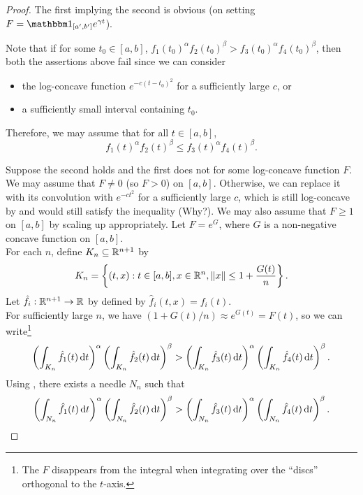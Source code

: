 \begin{proof}
	The first implying the second is obvious (on setting $F=\indic_{[a',b']}e^{\gamma t}$).

	Note that if for some $t_0\in[a,b]$, $f_1(t_0)^\alpha f_2(t_0)^\beta > f_3(t_0)^\alpha f_4(t_0)^\beta$, then both the assertions above fail since we can consider
	\begin{itemize}
		\item the log-concave function $e^{-c(t-t_0)^2}$ for a sufficiently large $c$, or
		\item a sufficiently small interval containing $t_0$.
	\end{itemize}
	Therefore, we may assume that for all $t\in[a,b]$,
	\begin{equation*}
		\label{eqn: init observation exp needle conv body}
		\tag{$*$}
		f_1(t)^\alpha f_2(t)^\beta \leq f_3(t)^\alpha f_4(t)^\beta.
	\end{equation*}

	Suppose the second holds and the first does not for some log-concave function $F$.\\
	We may assume that $F\neq 0$ (so $F>0$) on $[a,b]$. Otherwise, we can replace it with its convolution with $e^{-ct^2}$ for a sufficiently large $c$, which is still log-concave by  and would still satisfy the inequality (Why?). We may also assume that $F\geq 1$ on $[a,b]$ by scaling up appropriately. Let $F=e^G$, where $G$ is a non-negative concave function on $[a,b]$.\\
	For each $n$, define $K_n\subseteq\mathbb{R}^{n+1}$ by
	\[ K_n = \left\{ (t,x) : t\in[a,b], x\in\mathbb{R}^n, \left\lVert x\right\rVert \leq 1 + \frac{G(t)}{n} \right\}. \]
	Let $\hat{f}_i:\mathbb{R}^{n+1}\to\mathbb{R}$ by defined by $\hat{f}_i(t,x)=f_i(t)$.\\
	For sufficiently large $n$, we have $(1+G(t)/n)\approx e^{G(t)} = F(t)$, so we can write\footnote{The $F$ disappears from the integral when integrating over the ``discs'' orthogonal to the $t$-axis.}
	\[ \left(\int_{K_n} \hat{f}_1(t)\operatorname{d}\!{t}\right)^\alpha \left(\int_{K_n} \hat{f}_2(t)\operatorname{d}\!{t}\right)^\beta > \left(\int_{K_n} \hat{f}_3(t)\operatorname{d}\!{t}\right)^\alpha \left(\int_{K_n} \hat{f}_4(t)\operatorname{d}\!{t}\right)^\beta. \]
	Using , there exists a needle $N_n$ such that
	\[ \left(\int_{N_n} \hat{f}_1(t)\operatorname{d}\!{t}\right)^\alpha \left(\int_{N_n} \hat{f}_2(t)\operatorname{d}\!{t}\right)^\beta > \left(\int_{N_n} \hat{f}_3(t)\operatorname{d}\!{t}\right)^\alpha \left(\int_{N_n} \hat{f}_4(t)\operatorname{d}\!{t}\right)^\beta. \]


\end{proof}
